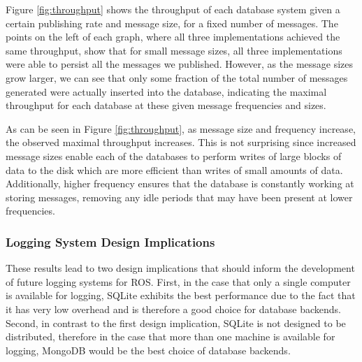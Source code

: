 \documentclass[nocopyrightspace]{acm_proc_article-sp}
\begin{document}
Figure \ref{fig:throughput} shows the throughput of each database system given a certain publishing rate and message size, for a fixed number of messages. The points on the left of each graph, where all three implementations achieved the same throughput, show that for small message sizes, all three implementations were able to persist all the messages we published. However, as the message sizes grow larger, we can see that only some fraction of the total number of messages generated were actually inserted into the database, indicating the maximal throughput for each database at these given message frequencies and sizes. 

As can be seen in Figure \ref{fig:throughput}, as message size and frequency increase, the observed maximal throughput increases. This is not surprising since increased message sizes enable each of the databases to perform writes of large blocks of data to the disk which are more efficient than writes of small amounts of data. Additionally, higher frequency ensures that the database is constantly working at storing messages, removing any idle periods that may have been present at lower frequencies.

\subsubsection{Logging System Design Implications}

These results lead to two design implications that should inform the development of future logging systems for ROS. First, in the case that only a single computer is available for logging, SQLite exhibits the best performance due to the fact that it has very low overhead and is therefore a good choice for database backends. Second, in contrast to the first design implication, SQLite is not designed to be distributed, therefore in the case that more than one machine is available for logging, MongoDB would be the best choice of database backends.
\end{document}
